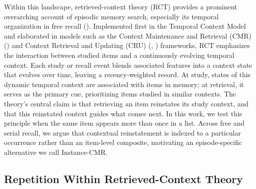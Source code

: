 \documentclass[
  man,
  floatsintext,
  longtable,
  nolmodern,
  notxfonts,
  notimes,
  draftfirst,
  colorlinks=true,linkcolor=blue,citecolor=blue,urlcolor=blue]{apa7}
\begin{document}
Within this landscape, retrieved-context theory (RCT) provides a
prominent overarching account of episodic memory search, especially its
temporal organization in free recall
().
Implemented first in the Temporal Context Model and elaborated in models
such as the Context Maintenance and Retrieval (CMR)
() and Context
Retrieval and Updating (CRU) (, ) frameworks, RCT emphasizes
the interaction between studied items and a continuously evolving
temporal context. Each study or recall event blends associated features
into a context state that evolves over time, leaving a recency‑weighted
record. At study, states of this dynamic temporal context are associated
with items in memory; at retrieval, it serves as the primary cue,
prioritizing items studied in similar contexts. The theory's central
claim is that retrieving an item reinstates its study context, and that
this reinstated context guides what comes next. In this work, we test
this principle when the same item appears more than once in a list.
Across free and serial recall, we argue that contextual reinstatement is
indexed to a particular occurrence rather than an item-level composite,
motivating an episode-specific alternative we call Instance-CMR.

\subsection{Repetition Within Retrieved-Context
Theory}\label{repetition-within-retrieved-context-theory}
\end{document}
